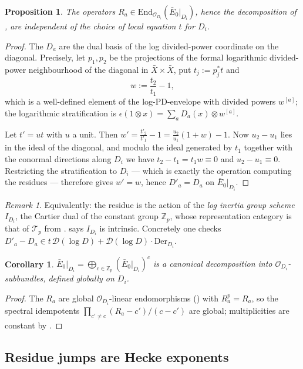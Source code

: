 \documentclass[11pt,reqno]{amsart}
\newcommand{\Zp}{\mathbb{Z}_p}
\newcommand{\cO}{\mathcal{O}}
\newcommand{\cD}{\mathcal{D}}
\newcommand{\cT}{\mathcal{T}}
\newcommand{\End}{\mathrm{End}}
\theoremstyle{plain}
\newtheorem{proposition}[theorem]{Proposition}
\newtheorem{corollary}[theorem]{Corollary}
\theoremstyle{definition}
\theoremstyle{remark}
\newtheorem{remark}[theorem]{Remark}
\numberwithin{equation}{section}
\begin{document}
\begin{proposition}\label{prop:coordfree}
The operators $R_a\in\End_{\cO_{D_i}}(\bar E_0|_{D_i})$, hence the
decomposition of , are independent of the choice of local
equation $t$ for $D_i$.
\end{proposition}
\begin{proof}
The $D_a$ are the dual basis of the log divided-power coordinate on the
diagonal.  Precisely, let $p_1,p_2$ be the projections of the formal
logarithmic divided-power neighbourhood of the diagonal in
$\bar X\times\bar X$, put $t_j:=p_j^*t$ and
\[
   w:=\frac{t_2}{t_1}-1 ,
\]
which is a well-defined element of the log-PD-envelope with divided powers
$w^{[a]}$; the logarithmic stratification is
$\epsilon(1\otimes x)=\sum_aD_a(x)\otimes w^{[a]}$.

Let $t'=ut$ with $u$ a unit.  Then
$w'=\frac{t'_2}{t'_1}-1=\frac{u_2}{u_1}(1+w)-1$.  Now
$u_2-u_1$ lies in the ideal of the diagonal, and modulo the ideal
generated by $t_1$ together with the conormal directions along $D_i$ we
have $t_2-t_1=t_1w\equiv0$ and $u_2-u_1\equiv0$.  Restricting the
stratification to $D_i$ --- which is exactly the operation computing the
residues --- therefore gives $w'=w$, hence $D'_a=D_a$ on
$\bar E_0|_{D_i}$.
\end{proof}

\begin{remark}
Equivalently: the residue is the action of the \emph{log inertia group
scheme} $I_{D_i}$, the Cartier dual of the constant group $\Zp$, whose
representation category is that of $\cT_p$ from
.   says $I_{D_i}$ is
intrinsic.  Concretely one checks
$D'_a-D_a\in t\,\cD(\log D)+\cD(\log D)\cdot\mathrm{Der}_{D_i}$.
\end{remark}

\begin{corollary}\label{cor:globaldecomp}
$\bar E_0|_{D_i}=\bigoplus_{c\in\Zp}(\bar E_0|_{D_i})^c$ is a canonical
decomposition into $\cO_{D_i}$-subbundles, defined globally on $D_i$.
\end{corollary}
\begin{proof}
The $R_a$ are global $\cO_{D_i}$-linear endomorphisms
() with $R_a^p=R_a$, so the spectral
idempotents $\prod_{c'\ne c}(R_a-c')/(c-c')$ are global; multiplicities are
constant by .
\end{proof}

\subsection{Residue jumps are Hecke exponents}
\end{document}
